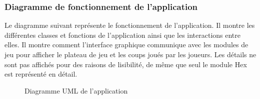 \subsubsection{Diagramme de fonctionnement de l'application}

Le diagramme suivant représente le fonctionnement de l'application. Il montre les différentes
classes et fonctions de l'application ainsi que les interactions entre elles.
Il montre comment l'interface graphique communique avec les modules de jeu pour afficher
le plateau de jeu et les coups joués par les joueurs. Les détails ne sont pas affichés
pour des raisons de lisibilité, de même que seul le module Hex est représenté en détail.

\begin{figure}[!htb]
    \centering
    \caption{Diagramme UML de l'application}\label{Fig:UML_app}
\end{figure}

